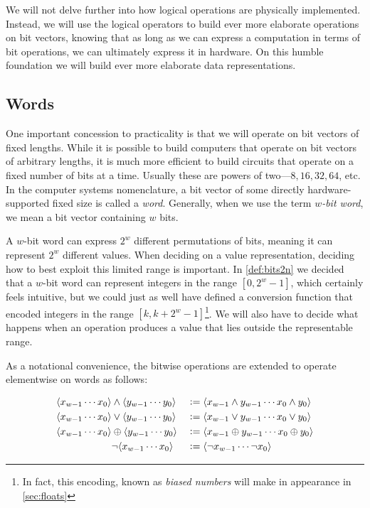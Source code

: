 We will not delve further into how logical operations are physically
implemented.  Instead, we will use the logical operators to build ever
more elaborate operations on bit vectors, knowing that as long as we
can express a computation in terms of bit operations, we can
ultimately express it in hardware.  On this humble foundation we will
build ever more elaborate data representations.

\subsection{Words}
\label{sec:words}

One important concession to practicality is that we will operate on
bit vectors of fixed lengths.  While it is possible to build computers
that operate on bit vectors of arbitrary lengths, it is much more
efficient to build circuits that operate on a fixed number of bits at
a time.  Usually these are powers of two---$8,16,32,64$, etc.  In the
computer systems nomenclature, a bit vector of some directly
hardware-supported fixed size is called a \emph{word}.  Generally,
when we use the term \emph{$w$-bit word}, we mean a bit vector
containing $w$ bits.

A $w$-bit word can express $2^{w}$ different permutations of bits,
meaning it can represent $2^{w}$ different values.  When deciding on a
value representation, deciding how to best exploit this limited range
is important.  In \cref{def:bits2n} we decided that a $w$-bit word can
represent integers in the range $[0,2^{w}-1]$, which certainly feels
intuitive, but we could just as well have defined a conversion
function that encoded integers in the range
$[k,k+2^{w}-1]$\footnote{In fact, this encoding, known as \emph{biased
    numbers} will make in appearance in \cref{sec:floats}}.  We will
also have to decide what happens when an operation produces a value
that lies outside the representable range.

As a notational convenience, the bitwise operations are extended to
operate elementwise on words as follows:

\begin{definition}
  \begin{align*}
    \langle x_{w-1}\cdots x_{0} \rangle &\land \langle y_{w-1}\cdots y_{0} \rangle &&\vcentcolon=
    \langle x_{w-1} \land y_{w-1}\cdots x_{0} \land y_{0} \rangle \\
    \langle x_{w-1}\cdots x_{0} \rangle &\lor \langle y_{w-1}\cdots y_{0} \rangle &&\vcentcolon=
    \langle x_{w-1} \lor y_{w-1} \cdots x_{0} \lor y_{0} \rangle \\
    \langle x_{w-1}\cdots x_{0} \rangle &\oplus \langle y_{w-1}\cdots y_{0} \rangle &&\vcentcolon=
    \langle x_{w-1} \oplus y_{w-1}\cdots x_{0} \oplus y_{0} \rangle \\
    &\neg \langle x_{w-1}\cdots x_{0} \rangle &&\vcentcolon= \langle \neg x_{w-1}\cdots \neg x_{0} \rangle
  \end{align*}
  \label{def:wordbitwise}
\end{definition}

